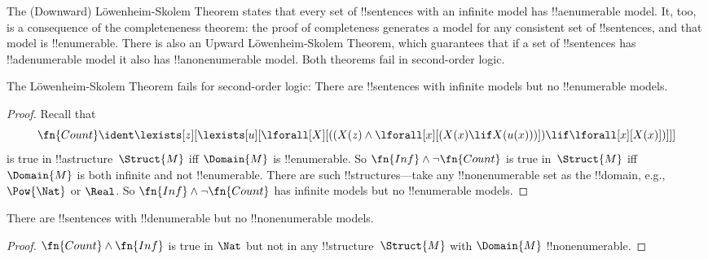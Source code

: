 \documentclass[../../../include/open-logic-section]{subfiles}
\begin{document}


\begin{explain}
The (Downward) L\"owenheim-Skolem Theorem states that every set of
!!{sentence}s with an infinite model has !!a{enumerable} model.  It,
too, is a consequence of the completeneness theorem: the proof of
completeness generates a model for any consistent set of
!!{sentence}s, and that model is !!{enumerable}.  There is also an
Upward L\"owenheim-Skolem Theorem, which guarantees that if a set of
!!{sentence}s has !!a{denumerable} model it also has
!!a{nonenumerable} model.  Both theorems fail in second-order logic.
\end{explain}


\begin{thm}
 The L\"owenheim-Skolem Theorem fails for
second-order logic: There are !!{sentence}s with infinite models but
no !!{enumerable} models.
\end{thm}

\begin{proof}
Recall that 
\[
\fn{Count} \ident \lexists[z][\lexists[u][\lforall[X][((X(z) \land
      \lforall[x][(X(x) \lif X(u(x)))]) \lif \lforall[x][X(x)])]]]
\]
is true in !!a{structure}~$\Struct{M}$ iff $\Domain{M}$ is
!!{enumerable}. So $\fn{Inf} \land \lnot\fn{Count}$ is true in~$\Struct{M}$
iff $\Domain{M}$ is both infinite and not !!{enumerable}.  There are
such !!{structure}s---take any !!{nonenumerable} set as the
!!{domain}, e.g., $\Pow{\Nat}$ or $\Real$. So $\fn{Inf} \land
\lnot \fn{Count}$ has infinite models but no !!{enumerable} models.
\end{proof}

\begin{thm}
There are !!{sentence}s with !!{denumerable} but no
!!{nonenumerable} models.
\end{thm}

\begin{proof}
$\fn{Count} \land \fn{Inf}$ is true in $\Nat$ but not in any
  !!{structure}~$\Struct{M}$ with $\Domain{M}$ !!{nonenumerable}.
\end{proof}
\end{document}
